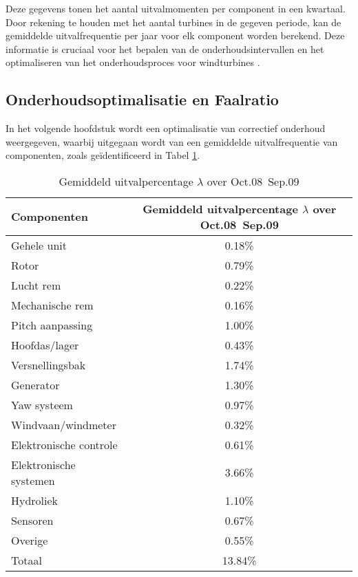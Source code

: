 Deze gegevens tonen het aantal uitvalmomenten per component in een kwartaal. Door rekening te houden met het aantal turbines in de gegeven periode, kan de gemiddelde uitvalfrequentie per jaar voor elk component worden berekend. Deze informatie is cruciaal voor het bepalen van de onderhoudsintervallen en het optimaliseren van het onderhoudsproces voor windturbines \cite{ding2010comparative}.

\subsection{Onderhoudsoptimalisatie en Faalratio}

In het volgende hoofdstuk wordt een optimalisatie van correctief onderhoud weergegeven, waarbij uitgegaan wordt van een gemiddelde uitvalfrequentie van componenten, zoals geïdentificeerd in Tabel \ref{tab:failure-rate}.

\begin{table}[h]
    \centering
    \begin{tabular}{|l|c|}
        \hline
        \textbf{Componenten} & \textbf{Gemiddeld uitvalpercentage $\lambda$ over Oct.08~Sep.09} \\
        \hline
        Gehele unit & 0.18\% \\
        Rotor & 0.79\% \\
        Lucht rem & 0.22\% \\
        Mechanische rem & 0.16\% \\
        Pitch aanpassing & 1.00\% \\
        Hoofdas/lager & 0.43\% \\
        Versnellingsbak & 1.74\% \\
        Generator & 1.30\% \\
        Yaw systeem & 0.97\% \\
        Windvaan/windmeter & 0.32\% \\
        Elektronische controle & 0.61\% \\
        Elektronische systemen & 3.66\% \\
        Hydroliek & 1.10\% \\
        Sensoren & 0.67\% \\
        Overige & 0.55\% \\
        \hline
        Totaal & 13.84\% \\
        \hline
    \end{tabular}
    \caption{Gemiddeld uitvalpercentage $\lambda$ over Oct.08~Sep.09 \cite{ding2010comparative}}
    \label{tab:failure-rate}
\end{table}


